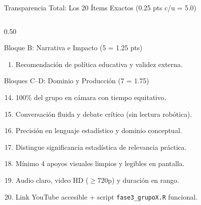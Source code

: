 \documentclass[aspectratio=169, 10pt]{beamer}
\begin{document}
\begin{frame}{Transparencia Total: Los 20 \'Items Exactos (0.25 pts c/u = 5.0)}
\begin{columns}[T]
\begin{column}{0.50\textwidth}
\begin{block}{\small Bloque B: Narrativa e Impacto (5 = 1.25 pts)}
\begin{enumerate}
          \item Recomendaci\'on de pol\'itica educativa y validez externa.
        \end{enumerate}
      \end{block}
      \vspace{1pt}
      \begin{block}{\small Bloques C--D: Dominio y Producci\'on (7 = 1.75)}
        \scriptsize
        \begin{enumerate}\setcounter{enumi}{13}\setlength{\itemsep}{1pt}
          \item 100\% del grupo en c\'amara con tiempo equitativo.
          \item Conversaci\'on fluida y debate cr\'itico (sin lectura rob\'otica).
          \item Precisi\'on en lenguaje estad\'istico y dominio conceptual.
          \item Distingue significancia estad\'istica de relevancia pr\'actica.
          \item M\'inimo 4 apoyos visuales limpios y legibles en pantalla.
          \item Audio claro, video HD ($\ge 720$p) y duraci\'on en rango.
          \item Link YouTube accesible + script \texttt{fase3\_grupoX.R} funcional.
        \end{enumerate}
      \end{block}
    \end{column}
  \end{columns}
\end{frame}
\end{document}
